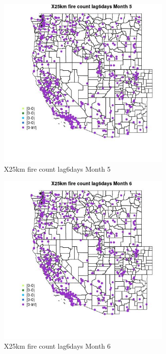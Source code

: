 \begin{figure} 
\centering  
\includegraphics[width=0.77\textwidth]{Code_Outputs/Report_ML_input_PM25_Step4_part_e_de_duplicated_aves_compiled_2019-05-14wNAs_MapObsMo5X25km_fire_count_lag6days.jpg} 
\caption{\label{fig:Report_ML_input_PM25_Step4_part_e_de_duplicated_aves_compiled_2019-05-14wNAsMapObsMo5X25km_fire_count_lag6days}X25km fire count lag6days Month 5} 
\end{figure} 
 

\begin{figure} 
\centering  
\includegraphics[width=0.77\textwidth]{Code_Outputs/Report_ML_input_PM25_Step4_part_e_de_duplicated_aves_compiled_2019-05-14wNAs_MapObsMo6X25km_fire_count_lag6days.jpg} 
\caption{\label{fig:Report_ML_input_PM25_Step4_part_e_de_duplicated_aves_compiled_2019-05-14wNAsMapObsMo6X25km_fire_count_lag6days}X25km fire count lag6days Month 6} 
\end{figure} 
 

